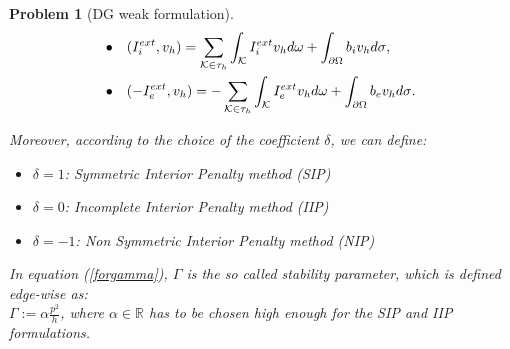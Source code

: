 \documentclass[a4paper,11pt]{article}
\newtheorem{problem}{Problem}
\begin{document}
\begin{problem}[DG weak formulation]
\begin{equation}
\begin{aligned}
    \newline
    \bullet& \quad (I_i^{ext},v_h)=\sum_{\mathcal{K} \in \tau_h} \int_{\mathcal{K}} {I_i^{ext} v_h d\omega}+\int_{\partial \Omega}{b_i v_h d\sigma},\\
    \newline
    \bullet& \quad (-I_e^{ext},v_h)=-\sum_{\mathcal{K} \in \tau_h} \int_{\mathcal{K}} {I_e^{ext} v_h d\omega}+\int_{\partial \Omega}{b_e v_h d\sigma}.
    \end{aligned}
    \end{equation}
    
    \noindent Moreover, according to the choice of the coefficient $\delta$, we can define:
    \begin{itemize}
    \item $\delta=1$: Symmetric Interior Penalty method (SIP)
    \item $\delta=0$: Incomplete Interior Penalty method (IIP)
    \item $\delta=-1$: Non Symmetric Interior Penalty method (NIP) 
    \end{itemize}
     \vspace{2mm}
    \noindent In equation (\ref{forgamma}), $\Gamma$ is the so called stability parameter, which is defined edge-wise as:\\ $\Gamma := \alpha \frac{p^2}{h}$, where $ \alpha \in \mathbb{R}$ has to be chosen high enough for the SIP and IIP formulations.
    \end{problem}
\end{document}

